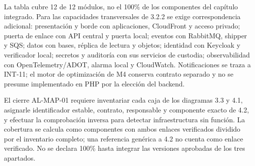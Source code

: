 La tabla cubre 12 de 12 módulos, no el 100\% de los componentes del capítulo integrado. Para las capacidades transversales de 3.2.2 se exige correspondencia adicional: presentación y borde con aplicaciones, CloudFront y acceso privado; puerta de enlace con API central y puerta local; eventos con RabbitMQ, shipper y SQS; datos con bases, réplica de lectura y objetos; identidad con Keycloak y verificador local; secretos y auditoría con sus servicios de custodia; observabilidad con OpenTelemetry/ADOT, alarma local y CloudWatch. Notificaciones se traza a INT-11; el motor de optimización de M4 conserva contrato separado y no se presume implementado en PHP por la elección del backend.

El cierre AL-MAP-01 requiere inventariar cada caja de los diagramas 3.3 y 4.1, asignarle identificador estable, contrato, responsable y componente exacto de 4.2, y efectuar la comprobación inversa para detectar infraestructura sin función. La cobertura se calcula como componentes con ambos enlaces verificados dividido por el inventario completo; una referencia genérica a 4.2 no cuenta como enlace verificado. No se declara 100\% hasta integrar las versiones aprobadas de los tres apartados.
